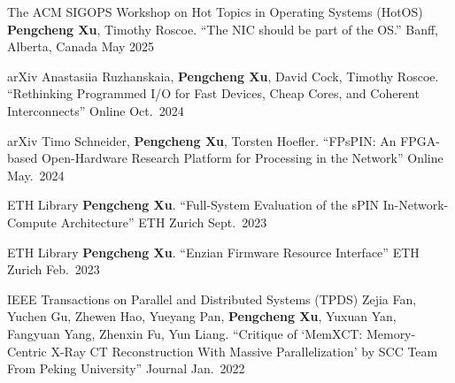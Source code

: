 


\begin{cventries}

  \cventry
    {The ACM SIGOPS Workshop on Hot Topics in Operating Systems (HotOS)}
    {{\normalfont \textbf{Pengcheng Xu}, Timothy Roscoe. ``The NIC should be part of the OS.''}}
    {Banff, Alberta, Canada} %
    {May 2025} %
    {}

  \cventry
    {arXiv}
    {{\normalfont Anastasiia Ruzhanskaia, \textbf{Pengcheng Xu}, David Cock, Timothy Roscoe. ``Rethinking Programmed I/O for Fast Devices, Cheap Cores, and Coherent Interconnects''}}
    {Online} %
    {Oct.\ 2024} %
    {}

  \cventry
    {arXiv}
    {{\normalfont Timo Schneider, \textbf{Pengcheng Xu}, Torsten Hoefler. ``FPsPIN: An FPGA-based Open-Hardware Research Platform for Processing in the Network''}}
    {Online} %
    {May.\ 2024} %
    {}

  \cventry
    {ETH Library}
    {{\normalfont \textbf{Pengcheng Xu}. ``Full-System Evaluation of the sPIN In-Network-Compute Architecture''}}
    {ETH Zurich} %
    {Sept.\ 2023} %
    {}

  \cventry
    {ETH Library}
    {{\normalfont \textbf{Pengcheng Xu}. ``Enzian Firmware Resource Interface''}}
    {ETH Zurich} %
    {Feb.\ 2023} %
    {}

  \cventry
    {IEEE Transactions on Parallel and Distributed Systems (TPDS)}
    {{\normalfont Zejia Fan, Yuchen Gu, Zhewen Hao, Yueyang Pan, \textbf{Pengcheng Xu}, Yuxuan Yan, Fangyuan Yang, Zhenxin Fu, Yun Liang. ``Critique of `MemXCT: Memory-Centric X-Ray CT Reconstruction With Massive Parallelization' by SCC Team From Peking University''}}
    {Journal} %
    {Jan.\ 2022} %
    {}


\end{cventries}

